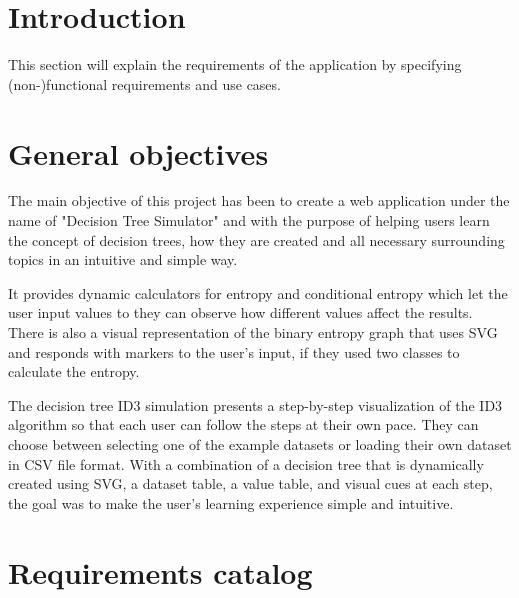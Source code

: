 
\section{Introduction}
This section will explain the requirements of the application by specifying (non-)functional requirements and use cases.

\section{General objectives}
The main objective of this project has been to create a web application under the name of "Decision Tree Simulator" and with the purpose of helping users learn the concept of decision trees, how they are created and all necessary surrounding topics in an intuitive and simple way.

It provides dynamic calculators for entropy and conditional entropy which let the user input values to they can observe how different values affect the results. There is also a visual representation of the binary entropy graph that uses SVG and responds with markers to the user's input, if they used two classes to calculate the entropy.

The decision tree ID3 simulation presents a step-by-step visualization of the ID3 algorithm so that each user can follow the steps at their own pace. They can choose between selecting one of the example datasets or loading their own dataset in CSV file format. With a combination of a decision tree that is dynamically created using SVG, a dataset table, a value table, and visual cues at each step, the goal was to make the user's learning experience simple and intuitive.

\section{Requirements catalog}
